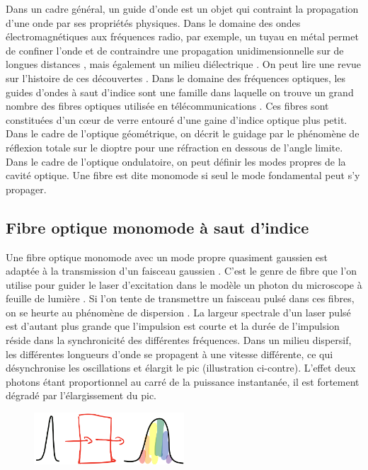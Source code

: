 Dans un cadre général, un guide d'onde est un objet qui contraint la propagation d'une onde par ses propriétés physiques. Dans le domaine des ondes électromagnétiques aux fréquences radio, par exemple, un tuyau en métal permet de confiner l'onde et de contraindre une propagation unidimensionnelle sur de longues distances \cite{miller_low-loss_1953}, mais également un milieu diélectrique \cite{unger_circular_1957}. On peut lire une revue sur l'histoire de ces découvertes \cite{packard_origin_1984}.
Dans le domaine des fréquences optiques, les guides d'ondes à saut d'indice sont une famille dans laquelle on trouve un grand nombre des fibres optiques utilisée en télécommunications \cite{maurer_glass_1973}. Ces fibres sont constituées d'un cœur de verre entouré d'une gaine d'indice optique plus petit. Dans le cadre de l'optique géométrique, on décrit le guidage par le phénomène de réflexion totale sur le dioptre pour une réfraction en dessous de l'angle limite. Dans le cadre de l'optique ondulatoire, on peut définir les modes propres de la cavité optique. Une fibre est dite monomode si seul le mode fondamental peut s'y propager.

\subsection{Fibre optique monomode à saut d'indice} %

Une fibre optique monomode avec un mode propre quasiment gaussien est adaptée à la transmission d'un faisceau gaussien \cite{ankiewicz_generalized_1992}. C'est le genre de fibre que l'on utilise pour guider le laser d'excitation dans le modèle un photon du microscope à feuille de lumière \cite{migault_whole-brain_2018}. Si l'on tente de transmettre un faisceau pulsé dans ces fibres, on se heurte au phénomène de dispersion \cite{gloge_dispersion_1971} \cite{jurgensen_gaussian_1978}. La largeur spectrale d'un laser pulsé est d'autant plus grande que l'impulsion est courte et la durée de l'impulsion réside dans la synchronicité des différentes fréquences. Dans un milieu dispersif, les différentes longueurs d'onde se propagent à une vitesse différente, ce qui désynchronise les oscillations et élargit le pic (illustration ci-contre). L'effet deux photons étant proportionnel au carré de la puissance instantanée, il est fortement dégradé par l'élargissement du pic.

\begin{figure}
    \vspace{-30pt}
    \begin{flushright}
      \includegraphics[width=0.5\textwidth]{./files/dispersion.svg.png}
    \end{flushright}
  \end{figure}

